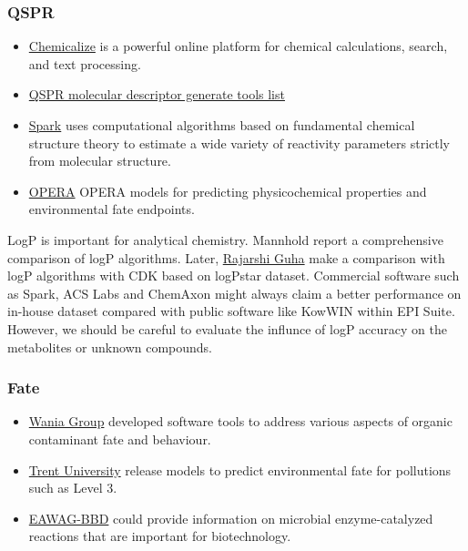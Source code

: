 \documentclass[
]{book}
\begin{document}
\hypertarget{qspr}{%
\subsubsection{QSPR}\label{qspr}}

\begin{itemize}
\item
  \href{https://chemicalize.com/}{Chemicalize} is a powerful online platform for chemical calculations, search, and text processing.
\item
  \href{http://www.moleculardescriptors.eu/resources/resources.htm}{QSPR molecular descriptor generate tools list}
\item
  \href{http://www.archemcalc.com/sparc.html}{Spark} uses computational algorithms based on fundamental chemical structure theory to estimate a wide variety of reactivity parameters strictly from molecular structure.
\item
  \href{https://jcheminf.biomedcentral.com/articles/10.1186/s13321-018-0263-1}{OPERA} OPERA models for predicting physicochemical properties and environmental fate endpoints\citep{mansouri2018}.
\end{itemize}

LogP is important for analytical chemistry. Mannhold \citep{mannhold2009} report a comprehensive comparison of logP algorithms. Later, \href{http://blog.rguha.net/?p=896}{Rajarshi Guha} make a comparison with logP algorithms with CDK based on logPstar dataset. Commercial software such as Spark, ACS Labs and ChemAxon might always claim a better performance on in-house dataset compared with public software like KowWIN within EPI Suite. However, we should be careful to evaluate the influnce of logP accuracy on the metabolites or unknown compounds.

\hypertarget{fate}{%
\subsubsection{Fate}\label{fate}}

\begin{itemize}
\item
  \href{https://www.utsc.utoronto.ca/labs/wania/downloads/}{Wania Group} developed software tools to address various aspects of organic contaminant fate and behaviour.
\item
  \href{http://www.trentu.ca/academic/aminss/envmodel/models/models.html}{Trent University} release models to predict environmental fate for pollutions such as Level 3.
\item
  \href{http://eawag-bbd.ethz.ch/index.html}{EAWAG-BBD} could provide information on microbial enzyme-catalyzed reactions that are important for biotechnology.
\end{itemize}
\end{document}
